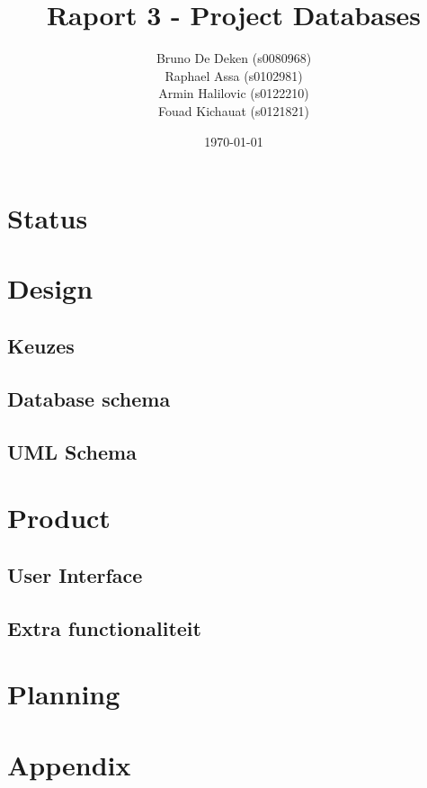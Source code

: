 \documentclass[12pt]{article}
\title{Raport 3 - Project Databases}
\author{
    Bruno De Deken (s0080968) \\
    Raphael Assa (s0102981) \\
    Armin Halilovic (s0122210) \\
    Fouad Kichauat (s0121821) \\
}
\date{\today}
\begin{document}
\maketitle
\clearpage

\tableofcontents
\clearpage

\section{Status}

\clearpage

\section{Design}
\subsection{Keuzes}

\subsection{Database schema}

\subsection{UML Schema}

\clearpage

\section{Product}
\subsection{User Interface}

\subsection{Extra functionaliteit}

\clearpage

\section{Planning}

\clearpage

\section{Appendix}

\clearpage
\end{document}
